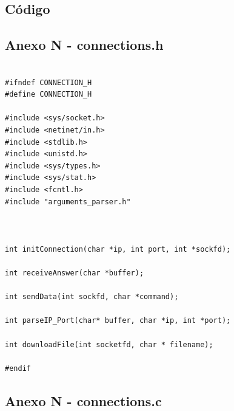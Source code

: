 \documentclass[11pt]{article}
\begin{document}
\pagebreak

\subsection{Código}

\subsection{ Anexo N - connections.h}

\begin{lstlisting}[style=CStyle]

#ifndef CONNECTION_H
#define CONNECTION_H

#include <sys/socket.h>
#include <netinet/in.h>
#include <stdlib.h>
#include <unistd.h>
#include <sys/types.h>
#include <sys/stat.h>
#include <fcntl.h>
#include "arguments_parser.h"



int initConnection(char *ip, int port, int *sockfd);

int receiveAnswer(char *buffer);

int sendData(int sockfd, char *command);

int parseIP_Port(char* buffer, char *ip, int *port);

int downloadFile(int socketfd, char * filename);

#endif

\end{lstlisting}

\subsection{ Anexo N - connections.c}
\end{document}
